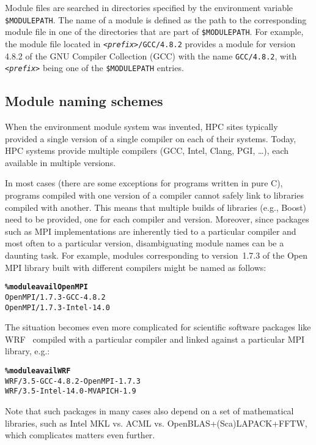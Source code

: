 Module files are searched in directories specified by the
environment variable \texttt{\small \$MODULEPATH}. The name of a module is defined
as the path to the corresponding module file in one of the directories that are
part of \texttt{\small \$MODULEPATH}. For example, the module file located in
\texttt{\small \emph{<prefix>}/GCC/4.8.2}
provides a module for version 4.8.2 of the GNU Compiler Collection (GCC) with the
name \texttt{\small GCC/4.8.2}, with \texttt{\small\emph{<prefix>}} being one of the
\texttt{\small \$MODULEPATH} entries.

\subsection{Module naming schemes}
\label{sec:Module_naming_scheme}
When the environment module system was invented, HPC sites typically provided
a single version of a single compiler on each of their systems.
Today, HPC systems provide multiple compilers (GCC, Intel,
Clang, PGI, \ldots), each available in multiple versions.

In most cases (there are some exceptions for programs written in pure C), programs
compiled with one version of a compiler cannot safely link to libraries compiled
with another. This means that multiple builds of libraries (e.g., Boost) need to be
provided, one for each compiler and version.
Moreover, since packages such as MPI implementations are inherently tied to a
particular compiler and most often to a particular version, disambiguating
module names can be a daunting task. For example, modules corresponding to
version~1.7.3 of the Open\,MPI library built with different compilers might be named
as follows:
{\small
\begin{alltt}
    \textbf{\% module avail OpenMPI}
    OpenMPI/1.7.3-GCC-4.8.2
    OpenMPI/1.7.3-Intel-14.0\
\end{alltt}
}

The situation becomes even more complicated for scientific software
packages like WRF~\cite{wrf} compiled with a particular compiler and linked
against a particular MPI library, e.g.:
{\small
\begin{alltt}
    \textbf{\% module avail WRF}
    WRF/3.5-GCC-4.8.2-OpenMPI-1.7.3
    WRF/3.5-Intel-14.0-MVAPICH-1.9\
\end{alltt}
}
\noindent
Note that such packages in many cases also depend on a set of mathematical
libraries, such as Intel MKL vs. ACML vs. OpenBLAS+(Sca)LAPACK+FFTW, which complicates matters even further.

